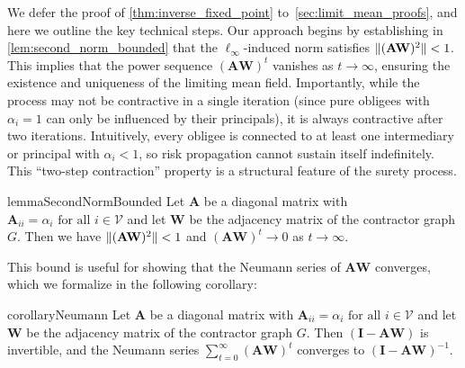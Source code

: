 \documentclass[mnsc,nonblindrev]{informs3}
\newcommand{\inv}{{-1}}
\newcommand{\A}{\mathbf{A}}
\newcommand{\W}{\mathbf{W}}
\newcommand{\I}{\mathbf{I}}
\DeclarePairedDelimiter{\norm}{\lVert}{\rVert}
\begin{document}
We defer the proof of \cref{thm:inverse_fixed_point} to~\cref{sec:limit_mean_proofs}, and here we outline the key technical steps. Our approach begins by establishing in \cref{lem:second_norm_bounded} that the $\ell_\infty$-induced norm satisfies $\norm{(\A\W)^2} < 1$. This implies that the power sequence $(\A\W)^t$ vanishes as $t \to \infty$, ensuring the existence and uniqueness of the limiting mean field. Importantly, while the process may not be contractive in a single iteration (since pure obligees with $\alpha_i = 1$ can only be influenced by their principals), it is always contractive after two iterations. Intuitively, every obligee is connected to at least one intermediary or principal with $\alpha_i < 1$, so risk propagation cannot sustain itself indefinitely. This ``two-step contraction'' property is a structural feature of the surety process.


\begin{restatable}{lemma}{SecondNormBounded}
\label{lem:second_norm_bounded}
Let $\A$ be a diagonal matrix with $\A_{ii}=\alpha_i \text{ for all } i \in \mathcal{V}$ and let $\W$ be the  adjacency matrix of the contractor graph $G$. Then we have $\norm{(\A\W)^2} < 1$ and $(\A\W)^t \to 0$ as $t \to \infty$.
\end{restatable}

{This bound is useful for showing that the Neumann series of $\A\W$ converges, which we formalize in the following corollary:}
\begin{restatable}{corollary}{Neumann}
\label{cor:neumann}
Let $\A$ be a diagonal matrix with $\A_{ii}=\alpha_i \text{ for all } i \in \mathcal{V}$ and let $\W$ be the  adjacency matrix of the contractor graph $G$. Then $(\I-\A\W)$ is invertible, and the Neumann series $\sum_{t=0}^{\infty} (\A\W)^t$ converges to $(\I-\A\W)^{\inv}$.
\end{restatable}
\end{document}
